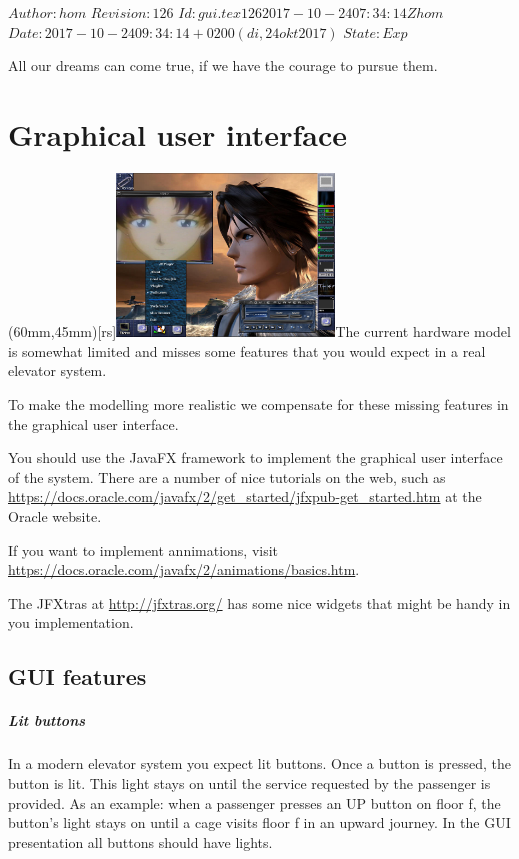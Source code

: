 \renewcommand\TheFile{gui.tex}
\SVN $Author: hom $
\SVN $Revision: 126 $
\SVN $Id: gui.tex 126 2017-10-24 07:34:14Z hom $
\SVN $Date: 2017-10-24 09:34:14 +0200 (di, 24 okt 2017) $
\SVN $State: Exp $
\begin{savequote}[8cm]
  \sffamily
  All our dreams can come true, if we have the courage to pursue them.
\end{savequote}
\chapter{Graphical user interface}

\parpic(60mm,45mm)[rs]{\includegraphics[width=58mm]{figures/gui-preview-02.jpg}}The current hardware model is somewhat limited and misses some
features that you would expect in a real elevator system.

To make the modelling more realistic we compensate for these missing
features in the graphical user interface.

You should use the JavaFX framework to implement the graphical
user interface of the system. There are a number of nice tutorials on
the web, such as \url{https://docs.oracle.com/javafx/2/get_started/jfxpub-get_started.htm}
at the Oracle website.

If you want to implement annimations, visit \url{https://docs.oracle.com/javafx/2/animations/basics.htm}.

The JFXtras at \url{http://jfxtras.org/} has some nice widgets that  might be handy in you implementation.
 
\section{GUI features}

\paragraph{Lit buttons} In a modern elevator system you expect lit
buttons. Once a button is pressed, the button is lit. This light
stays on until the service requested by the passenger is
provided. As an example: when a passenger presses an UP button on
floor f, the button's light stays on until a cage visits floor f in
an upward journey. In the GUI presentation all buttons should have
lights.

